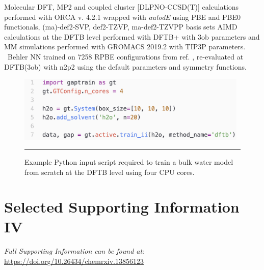 \documentclass[../../main.tex]{subfiles}
\begin{document}
Molecular DFT, MP2 and coupled cluster [DLPNO-CCSD(T)] calculations performed with ORCA\cite{Neese2012, Neese2017} v. 4.2.1 wrapped with \emph{autodE}\cite{autodE} using PBE\cite{Perdew1996} and PBE0\cite{Adamo1999} functionals, (ma)-def2-SVP, def2-TZVP, ma-def2-TZVPP basis sets\cite{Weigend2005} AIMD calculations at the DFTB level performed with DFTB+ with 3ob parameters\cite{Gaus2013} and MM simulations performed with GROMACS\cite{Berendsen1995, Abraham2015} 2019.2 with TIP3P parameters.\cite{Jorgensen1983} 
\
Behler NN\cite{Behler2007} trained on 7258 RPBE configurations from ref. \cite{Morawietz2016}, re-evaluated at DFTB(3ob) with n2p2\cite{Singraber2019} using the default parameters and symmetry functions. 


\begin{figure}[h!]
	\vspace{0.4cm}
	\centering
	\includegraphics[width=11cm]{6/gap/figs_ms/fig8}
	\vspace{0.2cm}
	\hrule
	\caption{Example Python input script required to train a bulk water model from scratch at the DFTB level using four CPU cores.}
	\label{fig::ml_8}
\end{figure}



\clearpage
\section{Selected Supporting Information IV}
\emph{Full Supporting Information can be found at}: {\url{https://doi.org/10.26434/chemrxiv.13856123}}
\end{document}
